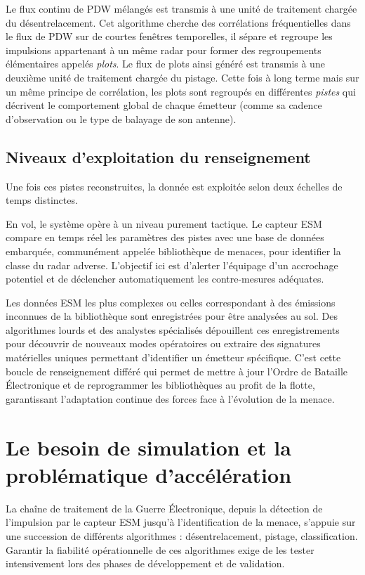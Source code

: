 Le flux continu de PDW mélangés est transmis à une unité de traitement chargée du désentrelacement. Cet algorithme cherche des corrélations fréquentielles dans le flux de PDW sur de courtes fenêtres temporelles, il sépare et regroupe les impulsions appartenant à un même radar pour former des regroupements élémentaires appelés \textit{plots}. Le flux de plots ainsi généré est transmis à une deuxième unité de traitement chargée du pistage. Cette fois à long terme mais sur un même principe de corrélation, les plots sont regroupés en différentes \textit{pistes} qui décrivent le comportement global de chaque émetteur (comme sa cadence d'observation ou le type de balayage de son antenne).

\subsection{Niveaux d'exploitation du renseignement} 
Une fois ces pistes reconstruites, la donnée est exploitée selon deux échelles de temps distinctes.

En vol, le système opère à un niveau purement tactique. Le capteur ESM compare en temps réel les paramètres des pistes avec une base de données embarquée, communément appelée bibliothèque de menaces, pour identifier la classe du radar adverse. L'objectif ici est d'alerter l'équipage d'un accrochage potentiel et de déclencher automatiquement les contre-mesures adéquates.

Les données ESM les plus complexes ou celles correspondant à des émissions inconnues de la bibliothèque sont enregistrées pour être analysées au sol. Des algorithmes lourds et des analystes spécialisés dépouillent ces enregistrements pour découvrir de nouveaux modes opératoires ou extraire des signatures matérielles uniques permettant d'identifier un émetteur spécifique. C'est cette boucle de renseignement différé qui permet de mettre à jour l'Ordre de Bataille Électronique et de reprogrammer les bibliothèques au profit de la flotte, garantissant l'adaptation continue des forces face à l'évolution de la menace.


\section{Le besoin de simulation et la problématique d'accélération}

La chaîne de traitement de la Guerre Électronique, depuis la détection de l'impulsion par le capteur ESM jusqu'à l'identification de la menace, s'appuie sur une succession de différents algorithmes : désentrelacement, pistage, classification. Garantir la fiabilité opérationnelle de ces algorithmes exige de les tester intensivement lors des phases de développement et de validation.

